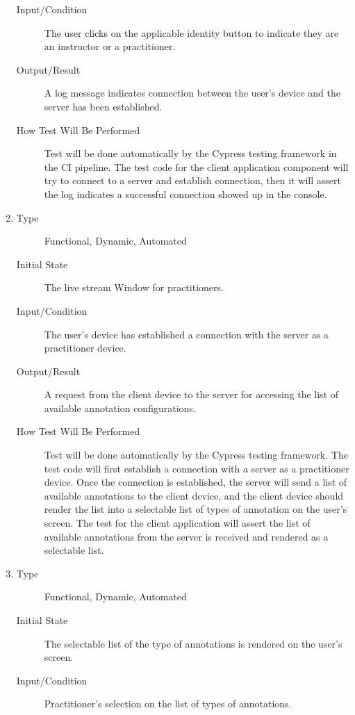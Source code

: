 \documentclass[12pt, titlepage]{article}
\newcommand{\rt}[1]{\textcolor{red}{#1}}
\begin{document}
\begin{enumerate}[FR-T1]
\begin{description}
  \item[Input/Condition] The user clicks on the applicable identity button to
    indicate they are an instructor or a practitioner.
  \item[Output/Result] A log message indicates connection between the user’s device
    and the server has been established.
  \item[How Test Will Be Performed] Test will be done automatically by the Cypress
    testing framework in the CI pipeline. The test code for the client
    application component will try to connect to a server and establish
    connection, then it will assert the log indicates a successful connection
    showed up in the console.
  \end{description}
\item \label{FRT4}
  \begin{description}
  \item[Type] Functional, Dynamic, Automated
  \item[Initial State] The live stream Window for practitioners.
  \item[Input/Condition] The user’s device has established a connection with the
    server as a practitioner device.
  \item[Output/Result] A request from the client device to the server for accessing
    the list of available annotation configuration\rt{s}.
  \item[How Test Will Be Performed] Test will be done automatically by the Cypress
    testing framework. The test code will first establish \rt{a} connection with a
    server as a practitioner device. Once the connection is established, the
    server will send a list of available annotations to the client device, and
    the client device should render the list into a selectable list of type\rt{s} of
    annotation on the user's screen. The test for the client application will
    assert the list of available annotations from the server is received and
    rendered as a selectable list.
  \end{description}
\item \label{FRT5}
  \begin{description}
  \item[Type] Functional, Dynamic, Automated
  \item[Initial State] The selectable list of the type of annotations is
    rendered on the user's screen.
  \item[Input/Condition] Practitioner’s selection on the list of types of
    annotations.

\end{description}
\end{enumerate}
\end{document}
